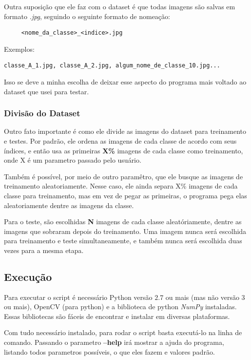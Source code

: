 Outra suposição que ele faz com o dataset é que todas imagens são salvas em formato \emph{.jpg},
seguindo o seguinte formato de nomeação:
\begin{verbatim}
     <nome_da_classe>_<indice>.jpg
\end{verbatim}
Exemplos: 
\begin{verbatim}
classe_A_1.jpg, classe_A_2.jpg, algum_nome_de_classe_10.jpg...
\end{verbatim}

Isso se deve a minha escolha de deixar esse aspecto do programa mais voltado ao dataset
que usei para testar.

\subsubsection{Divisão do Dataset}
Outro fato importante é como ele divide as imagens do dataset para treinamento e testes.
Por padrão, ele ordena as imagens de cada classe de acordo com seus índices, e então usa as 
primeiras \textbf{X\%} imagens de cada classe como treinamento, onde X é um parametro passado pelo usuário.

Também é possível, por meio de outro paramêtro, que ele busque as imagens de treinamento aleatoriamente.
Nesse caso, ele ainda separa X\% imagens de cada classe para treinamento, mas em vez de pegar as
primeiras, o programa pega elas aleatoriamente dentre as imagens da classe.

Para o teste, são escolhidas \textbf{N} imagens de cada classe aleatóriamente, dentre as imagens que
sobraram depois do treinamento. Uma imagem nunca será escolhida para treinamento e teste simultaneamente,
e também nunca será escolhida duas vezes para a mesma etapa.

\subsection{Execução}
Para executar o script é necessário Python versão $2.7$ ou mais (mas não versão 3 ou mais),
OpenCV (para python) e a biblioteca de python \emph{NumPy} instaladas. Essas bibliotecas são
fáceis de encontrar e instalar em diversas plataformas.

Com tudo necessário instalado, para rodar o script basta executá-lo na linha de comando.
Passando o parametro \textbf{--help} irá mostrar a ajuda do programa, listando todos 
parametros possíveis, o que eles fazem e valores padrão.

